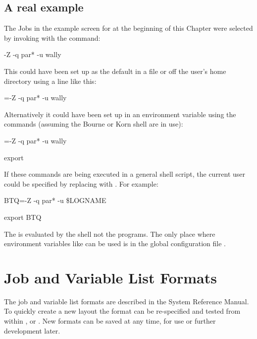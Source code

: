 \subsection{A real example}
The Jobs in the example screen for \PrBtq{} at the
beginning of this Chapter were selected by invoking
\PrBtq{} with the command:

\begin{expara}

\BtqName{} -Z -q {\textquotesingle}par*{\textquotesingle} -u wally

\end{expara}

This could have been set up as the default in a
\configurationfile{} file or off the user's home directory \homeconfigpath{} using a line like this:

\begin{expara}

\BtqVarname=-Z -q par* -u wally

\end{expara}

Alternatively it could have been set up in an environment variable using
the commands (assuming the Bourne or Korn shell are in use):

\begin{expara}

\BtqVarname={\textquotedbl}-Z -q par* -u wally{\textquotedbl}

export \BtqVarname

\end{expara}

If these commands are being executed in a general shell script, the
current user could be specified by replacing  with
. For example:

\begin{expara}

BTQ={\textquotedbl}-Z -q par* -u \$LOGNAME{\textquotedbl}

export BTQ

\end{expara}

The  is evaluated by the shell not the
\ProductName{} programs. The only place where environment variables like
 can be used is in the global
configuration file \masterconfig.

\section{Job and Variable List Formats}
The job and variable list formats are described in the System Reference
Manual. To quickly create a new layout the format can be re-specified
and tested from within \PrBtq{}, \PrXbtq{} or \PrXmbtq.
New formats can be saved at any time, for
use or further development later.

